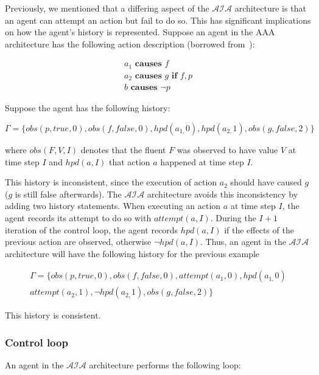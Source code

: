 Previously, we mentioned that a differing aspect of the $\mathcal{AIA}$ architecture is that an agent can attempt an action but fail to do so.
This has significant implications on how the agent's history is represented.
Suppose an agent in the AAA architecture has the following action description (borrowed from~\citep{blount_towards_2014}):

\begin{gather*}
    a_1 \textbf{ causes } f \\
    a_2 \textbf{ causes } g \textbf{ if } f, p \\
    b \textbf{ causes } \neg p
\end{gather*}

Suppose the agent has the following history:

$$
\Gamma=\{obs\left(p,true,0\right),obs\left(f,false,0\right),hpd\left(a_{1,}0\right),hpd\left(a_{2,}1\right),obs\left(g,false,2\right)\}
$$

\noindent
where $obs(F, V, I)$ denotes that the fluent $F$ was observed to have value $V$ at time step $I$ and $hpd(a, I)$ that action $a$ happened at time step $I$.

This history is inconsistent, since the execution of action $a_2$ should have caused $g$ ($g$ is still false afterwards).
The $\mathcal{AIA}$ architecture avoids this inconsistency by adding two history statements.
When executing an action $a$ at time step $I$, the agent records its attempt to do so with $attempt(a, I)$.
During the $I+1$ iteration of the control loop, the agent records $hpd(a, I)$ if the effects of the previous action are observed, otherwise $\neg hpd(a, I)$.
Thus, an agent in the $\mathcal{AIA}$ architecture will have the following history for the previous example

\begin{multline*}
    \Gamma=\{
        obs\left(p,true,0\right),obs\left(f,false,0\right),attempt(a_1, 0),hpd\left(a_{1,}0\right) \\
        attempt(a_2, 1), \neg hpd\left(a_{2,}1\right),obs\left(g,false,2\right)
    \}
\end{multline*}

This history is consistent.

\subsubsection{Control loop}
\label{subsubsec:control_loop}

An agent in the $\mathcal{AIA}$ architecture performs the following loop:

